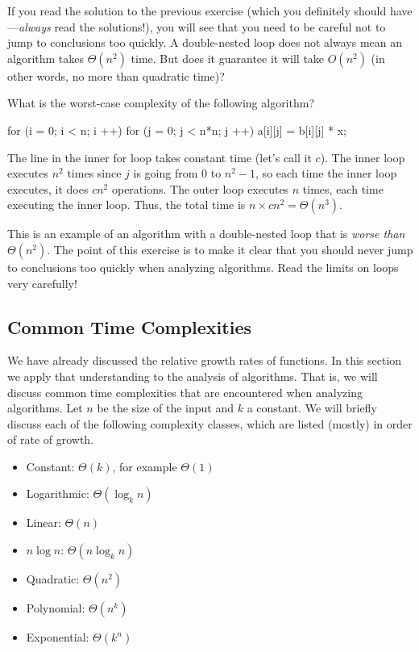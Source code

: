 If you read the solution to the previous exercise 
(which you definitely should have---{\em always} read the solutions!), 
you will see that you need to be careful not to jump to conclusions too quickly.
A double-nested loop does not always mean an algorithm takes $\Theta(n^2)$ time.
But does it guarantee it will take $O(n^2)$ (in other words, no more than quadratic
time)?

\newpage

\begin{exer}
What is the worst-case complexity of the following algorithm?
\begin{code}
    for (i = 0; i < n; i ++) {
        for (j = 0; j < n*n; j ++) {
            a[i][j] = b[i][j] * x;
        }
    }
\end{code} 
\vspace*{2.25in}
\begin{answer}
The line in the inner for loop takes constant time (let's call it $c$).
The inner loop executes $n^2$ times since $j$ is going from
$0$ to $n^2-1$, so each time the inner loop executes, it does $cn^2$ operations.
The outer loop executes $n$ times, each time executing the inner loop.
Thus, the total time is $n\times cn^2=\Theta(n^3)$.

This is an example of an algorithm with a double-nested loop 
that is {\em worse than} $\Theta(n^2)$.  The point of this exercise is to make
it clear that you should never jump to conclusions too quickly when analyzing
algorithms.  Read the limits on loops very carefully!
\end{answer}
\end{exer}
\subsection{Common Time Complexities}\label{section:growthRates}

We have already discussed the relative growth rates of functions.
In this section we apply that understanding to the analysis of algorithms.
That is, we will discuss common time complexities that are encountered
when analyzing algorithms. 
Let $n$ be the size of the input and $k$ a constant. 
We will briefly discuss each of the following complexity classes,
which are listed (mostly) in order of rate of growth.

\begin{itemize}
\item Constant: $\Theta(k)$, for example $\Theta(1)$
\item Logarithmic: $\Theta(\log_{k}n)$
\item Linear: $\Theta(n)$ 
\item $n\log n$: $\Theta(n \log_{k}n)$
\item Quadratic: $\Theta(n^{2})$ 
\item Polynomial: $\Theta(n^k)$
\item Exponential: $\Theta(k^{n})$
\end{itemize}

